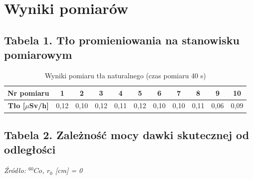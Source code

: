 \documentclass{article}
\begin{document}
\section{Wyniki pomiarów}


\subsection*{Tabela 1. Tło promieniowania na stanowisku pomiarowym}
\begin{table}[H]
\centering
\renewcommand{\arraystretch}{1.5}
\begin{tabular}{|c|c|c|c|c|c|c|c|c|c|c|}
\hline
\textbf{Nr pomiaru} & 1 & 2 & 3 & 4 & 5 & 6 & 7 & 8 & 9 & 10 \\ \hline
\textbf{Tło [$\mu$Sv/h]} &0,12&0,10 &0,12 &0,11 &0,12 &0,10 &0,10 &0,11 &0,06 &0,09  \\ \hline
\end{tabular}
\caption{Wyniki pomiaru tła naturalnego (czas pomiaru 40 s)}
\end{table}


\subsection*{Tabela 2. Zależność mocy dawki skutecznej od odległości}
\textit{Źródło: $^{60}Co$, $r_0$ [cm] = 0}
\end{document}
